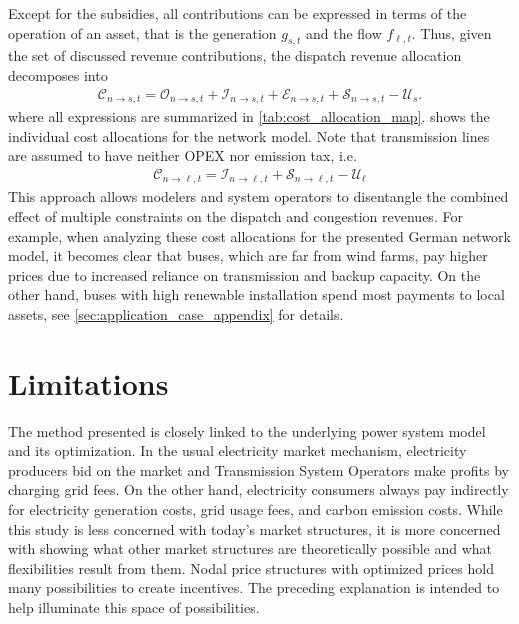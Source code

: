 \documentclass[11pt,twocolumn]{article}
\newcommand{\ie}{i.e.}
\newcommand{\ra}{\rightarrow}
\newcommand{\generation}{g_{s,t}}
\newcommand{\flow}{f_{\ell,t}}
\newcommand{\cost}{\mathcal{C}}
\newcommand{\opex}{\mathcal{O}}
\newcommand{\capex}{\mathcal{I}}
\newcommand{\emissioncost}{\mathcal{E}}
\newcommand{\scarcitycost}{\mathcal{S}}
\newcommand{\subsidycost}{\mathcal{U}}
\newcommand{\allocategeneratorcost}[1][n \rightarrow s]{\cost_{#1, t}}
\newcommand{\allocatelinecost}[1][n \rightarrow \ell]{\cost_{#1, t}}
\newcommand{\allocatecapex}[1][n \rightarrow s,t]{\mathcal{I}_{#1}}
\newcommand{\allocateopex}[1][n \rightarrow s]{\opex_{#1,t}}
\newcommand{\allocateemissioncost}[1][n \rightarrow s]{\emissioncost_{#1,t}}
\newcommand{\allocatescarcitycost}[1][n \rightarrow s]{\scarcitycost_{#1,t}}
\begin{document}
Except for the subsidies, all contributions can be expressed in terms of the operation of an asset, that is the generation $\generation$ and the flow $\flow$. Thus, given the set of discussed revenue contributions, the dispatch revenue allocation decomposes into
\begin{align}
    \allocategeneratorcost = \allocateopex + \allocatecapex + \allocateemissioncost + \allocatescarcitycost - \subsidycost_s .
\end{align}
where all expressions are summarized in \cref{tab:cost_allocation_map}.  shows the individual cost allocations for the network model. Note that transmission lines are assumed to have neither \ac{OPEX} nor emission tax, \ie
\begin{align}
    \allocatelinecost = \capex_{n \ra \ell, t} + \scarcitycost_{n \ra \ell, t} - \subsidycost_\ell
\end{align}
This approach allows modelers and system operators to disentangle the combined effect of multiple constraints on the dispatch and congestion revenues. For example, when analyzing these cost allocations for the presented German network model, it becomes clear that buses, which are far from wind farms, pay higher prices due to increased reliance on transmission and backup capacity. On the other hand, buses with high renewable installation spend most payments to local assets, see \cref{sec:application_case_appendix} for details.



\section{Limitations}
\label{sec:limitations}

The method presented is closely linked to the underlying power system model and its optimization. In the usual electricity market mechanism, electricity producers bid on the market and Transmission System Operators make profits by charging grid fees. On the other hand, electricity consumers always pay indirectly for electricity generation costs, grid usage fees, and carbon emission costs.
While this study is less concerned with today's market structures, it is more concerned with showing what other market structures are theoretically possible and what flexibilities result from them. Nodal price structures with optimized prices hold many possibilities to create incentives. The preceding explanation is intended to help illuminate this space of possibilities.
\end{document}
